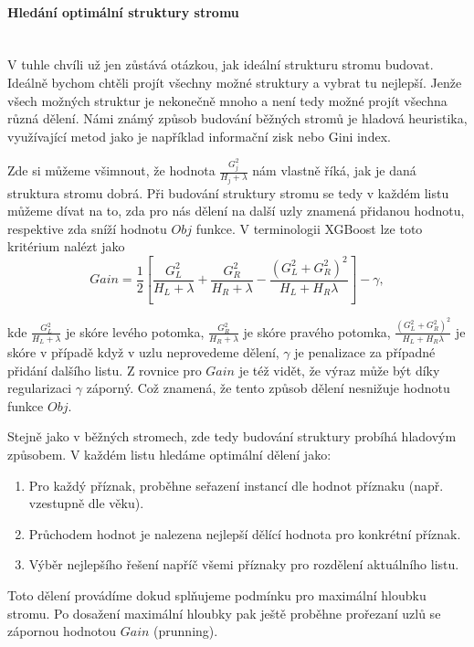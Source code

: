 \documentclass[a4paper]{article}
\begin{document}
\paragraph{Hledání optimální struktury stromu} \mbox{} \\
V tuhle chvíli už jen zůstává otázkou, jak ideální strukturu stromu budovat. Ideálně bychom chtěli projít všechny možné struktury a vybrat tu nejlepší. Jenže všech možných struktur je nekonečně mnoho a není tedy možné projít všechna různá dělení. Námi známý způsob budování běžných stromů je hladová heuristika, využívající metod jako je například informační zisk nebo Gini index.

Zde si můžeme všimnout, že hodnota $\frac{G_j^2}{H_j + \lambda}$ nám vlastně říká, jak je daná struktura stromu dobrá. Při budování struktury stromu se tedy v každém listu můžeme dívat na to, zda pro nás dělení na další uzly znamená přidanou hodnotu, respektive zda sníží hodnotu $Obj$ funkce. V terminologii XGBoost lze toto kritérium nalézt jako
    \begin{equation}
        Gain = \frac{1}{2} \left[\frac{G_L^2}{H_L + \lambda} + \frac{G_R^2}{H_R + \lambda}
        - \frac{(G_L^2 + G_R^2)^2}{H_L + H_R\lambda} \right] - \gamma,
    \end{equation}

kde $\frac{G_L^2}{H_L + \lambda}$ je skóre levého potomka, $\frac{G_R^2}{H_R + \lambda}$ je skóre pravého potomka, $\frac{(G_L^2 + G_R^2)^2}{H_L + H_R\lambda}$ je skóre v případě když v uzlu neprovedeme dělení, $\gamma$ je penalizace za případné přidání dalšího listu. Z rovnice pro $Gain$ je též vidět, že výraz může být díky regularizaci $\gamma$ záporný. Což znamená, že tento způsob dělení nesnižuje hodnotu funkce $Obj$.

Stejně jako v běžných stromech, zde tedy budování struktury probíhá hladovým způsobem. V každém listu hledáme optimální dělení jako:
\begin{enumerate}
\item Pro každý příznak, proběhne seřazení instancí dle hodnot příznaku (např. vzestupně dle věku).
\item Průchodem hodnot je nalezena nejlepší dělící hodnota pro konkrétní příznak.
\item Výběr nejlepšího řešení napříč všemi příznaky pro rozdělení aktuálního listu.
\end{enumerate}
Toto dělení provádíme dokud splňujeme podmínku pro maximální hloubku stromu. Po dosažení maximální hloubky pak ještě proběhne prořezaní uzlů se zápornou hodnotou $Gain$ (prunning). 
\end{document}

